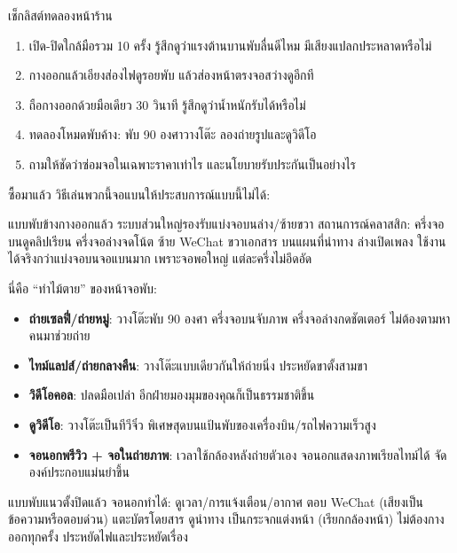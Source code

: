 \begin{tcbpractice}{เช็กลิสต์ทดลองหน้าร้าน}
\begin{enumerate}
  \item เปิด-ปิดใกล้มือรวม 10 ครั้ง รู้สึกดูว่าแรงต้านบานพับลื่นดีไหม มีเสียงแปลกประหลาดหรือไม่
  \item กางออกแล้วเอียงส่องไฟดูรอยพับ แล้วส่องหน้าตรงจอสว่างดูอีกที
  \item ถือกางออกด้วยมือเดียว 30 วินาที รู้สึกดูว่าน้ำหนักรับได้หรือไม่
  \item ทดลองโหมดพับค้าง: พับ 90 องศาวางโต๊ะ ลองถ่ายรูปและดูวิดีโอ
  \item ถามให้ชัดว่าซ่อมจอในเฉพาะราคาเท่าไร และนโยบายรับประกันเป็นอย่างไร
\end{enumerate}

\end{tcbpractice}


ซื้อมาแล้ว วิธีเล่นพวกนี้จอแบนให้ประสบการณ์แบบนี้ไม่ได้:


แบบพับข้างกางออกแล้ว ระบบส่วนใหญ่รองรับแบ่งจอบนล่าง/ซ้ายขวา สถานการณ์คลาสสิก: ครึ่งจอบนดูคลิปเรียน ครึ่งจอล่างจดโน้ต ซ้าย WeChat ขวาเอกสาร บนแผนที่นำทาง ล่างเปิดเพลง ใช้งานได้จริงกว่าแบ่งจอบนจอแบนมาก เพราะจอพอใหญ่ แต่ละครึ่งไม่อึดอัด


นี่คือ “ท่าไม้ตาย” ของหน้าจอพับ:

\begin{itemize}
  \item \textbf{ถ่ายเซลฟี่/ถ่ายหมู่}: วางโต๊ะพับ 90 องศา ครึ่งจอบนจับภาพ ครึ่งจอล่างกดชัตเตอร์ ไม่ต้องตามหาคนมาช่วยถ่าย
  \item \textbf{ไทม์แลปส์/ถ่ายกลางคืน}: วางโต๊ะแบบเดียวกันให้ถ่ายนิ่ง ประหยัดขาตั้งสามขา
  \item \textbf{วิดีโอคอล}: ปลดมือเปล่า อีกฝ่ายมองมุมของคุณก็เป็นธรรมชาติขึ้น
  \item \textbf{ดูวิดีโอ}: วางโต๊ะเป็นทีวีจิ๋ว พิเศษสุดบนแป้นพับของเครื่องบิน/รถไฟความเร็วสูง
  \item \textbf{จอนอกพรีวิว + จอในถ่ายภาพ}: เวลาใช้กล้องหลังถ่ายตัวเอง จอนอกแสดงภาพเรียลไทม์ได้ จัดองค์ประกอบแม่นยำขึ้น
\end{itemize}


แบบพับแนวตั้งปิดแล้ว จอนอกทำได้: ดูเวลา/การแจ้งเตือน/อากาศ ตอบ WeChat (เสียงเป็นข้อความหรือตอบด่วน) แตะบัตรโดยสาร ดูนำทาง เป็นกระจกแต่งหน้า (เรียกกล้องหน้า) ไม่ต้องกางออกทุกครั้ง ประหยัดไฟและประหยัดเรื่อง

